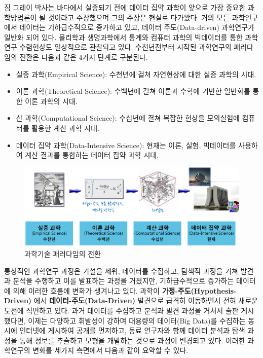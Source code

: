 \documentclass[smallextended]{svjour3}       %
\providecommand{\tightlist}{%
  \setlength{\itemsep}{0pt}\setlength{\parskip}{0pt}}
\begin{document}
짐 그레이 박사는 바다에서 실종되기 전에 데이터 집약
과학\citep{hey2009fourth}이 앞으로 가장 중요한 과학방법론이 될 것이라고
주장했으며 그의 주장은 현실로 다가왔다. 거의 모든 과학연구에서 데이터는
기하급수적으로 증가하고 있고, 데이터 주도(Data-driven) 과학연구가 일반화
되어 있다. 물리학과 생명과학에서 통계와 컴퓨터 과학의 빅데이터를 통한
과학연구 수렴현상도 일상적으로 관찰되고 있다. 수천년전부터 시작된
과학연구의 패러다임의 전환은 다음과 같은 4가지 단계로 구분된다.

\begin{itemize}
\tightlist
\item
  실증 과학(Empirical Science): 수천년에 걸쳐 자연현상에 대한 실증
  과학의 시대.
\item
  이론 과학(Theoretical Science): 수백년에 걸쳐 이론과 수학에 기반한
  일반화를 통한 이론 과학의 시대.
\item
  산 과학(Computational Science): 수십년에 결쳐 복잡한 현상을 모의실험에
  컴퓨터를 활용한 계산 과학 시대.
\item
  데이터 집약 과학(Data-Intensive Science): 현재는 이론, 실험,
  빅데이터를 사용하여 계산 결과를 통합하는 데이터 집약 과학 시대.
\end{itemize}

\begin{figure}
\centering
\includegraphics{fig/ai-lab-4th-paradigm.png}
\caption{과학기술 패러다임의 전환}
\end{figure}

통상적인 과학연구 과정은 가설을 세워, 데이터를 수집하고, 탐색적 과정을
거쳐 발견과 분석을 수행하고 이를 발표하는 과정을 거졌지만,
기하급수적으로 증가하는 데이터에 의해 이러한 흐름에 변화가 생겨나고
있다. 과학이 \textbf{가정-주도(Hypothesis-Driven)} 에서
\textbf{데이터-주도(Data-Driven)} 발견으로 급격히 이동하면서 전혀 새로운
도전에 직면하고 있다. 과거 데이터를 수집하고 분석과 발견 과정을 거쳐서
출판 게시했다면, 이제는 다양하고 휘발성이 강하며 대용량의 데이터(Big
Data)를 수집하는 동시에 인터넷에 게시하여 공개를 먼저하고, 동료 연구자와
함께 데이터 분석과 탐색 과정을 통해 정보를 추출하고 모형을 개발하는
것으로 과정이 변경되고 있다. 이러한 과학연구의 변화를 세가지 측면에서
다음과 같이 요약할 수 있다.
\end{document}
